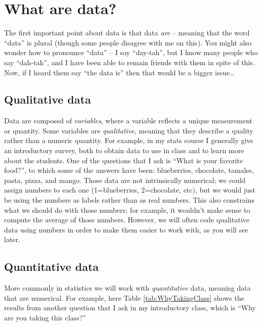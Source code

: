 \documentclass[12pt,]{book}
\theoremstyle{definition}
\theoremstyle{definition}
\theoremstyle{definition}
\theoremstyle{remark}
\begin{document}
\hypertarget{what-are-data}{%
\section{What are data?}\label{what-are-data}}

The first important point about data is that data \emph{are} -- meaning that the word ``data'' is plural (though some people disagree with me on this). You might also wonder how to pronounce ``data'' -- I say ``day-tah'', but I know many people who say ``dah-tah'', and I have been able to remain friends with them in spite of this. Now, if I heard them say ``the data is'' then that would be a bigger issue\ldots{}

\hypertarget{qualitative-data}{%
\subsection{Qualitative data}\label{qualitative-data}}

Data are composed of \emph{variables}, where a variable reflects a unique measurement or quantity. Some variables are \emph{qualitative}, meaning that they describe a quality rather than a numeric quantity. For example, in my stats course I generally give an introductory survey, both to obtain data to use in class and to learn more about the students. One of the questions that I ask is ``What is your favorite food?'', to which some of the answers have been: blueberries, chocolate, tamales, pasta, pizza, and mango. Those data are not intrinsically numerical; we could assign numbers to each one (1=blueberries, 2=chocolate, etc), but we would just be using the numbers as labels rather than as real numbers. This also constrains what we should do with those numbers; for example, it wouldn't make sense to compute the average of those numbers. However, we will often code qualitative data using numbers in order to make them easier to work with, as you will see later.

\hypertarget{quantitative-data}{%
\subsection{Quantitative data}\label{quantitative-data}}

More commonly in statistics we will work with \emph{quantitative} data, meaning data that are numerical. For example, here Table \ref{tab:WhyTakingClass} shows the results from another question that I ask in my introductory class, which is ``Why are you taking this class?''
\end{document}

